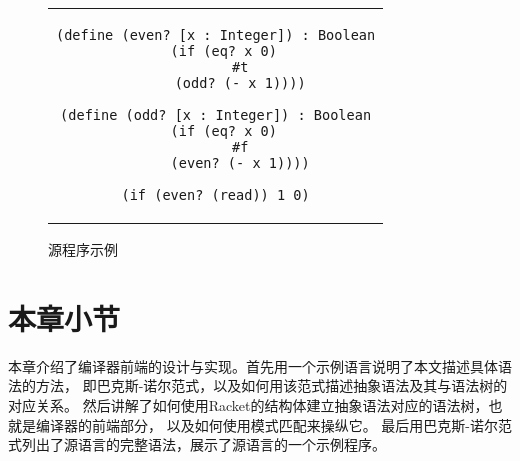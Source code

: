 \begin{figure}[t]
\begin{center}
\begin{tabular}{c}
\begin{lstlisting}
(define (even? [x : Integer]) : Boolean
  (if (eq? x 0)
      #t
      (odd? (- x 1))))

(define (odd? [x : Integer]) : Boolean
  (if (eq? x 0)
      #f
      (even? (- x 1))))

(if (even? (read)) 1 0)
\end{lstlisting}
\end{tabular}
\end{center}
    \caption{源程序示例}
    \label{fig:source-program-eg}
\end{figure}


\section{本章小节}

本章介绍了编译器前端的设计与实现。首先用一个示例语言说明了本文描述具体语法的方法，
即巴克斯-诺尔范式，以及如何用该范式描述抽象语法及其与语法树的对应关系。
然后讲解了如何使用Racket的结构体建立抽象语法对应的语法树，也就是编译器的前端部分，
以及如何使用模式匹配来操纵它。
最后用巴克斯-诺尔范式列出了源语言的完整语法，展示了源语言的一个示例程序。
